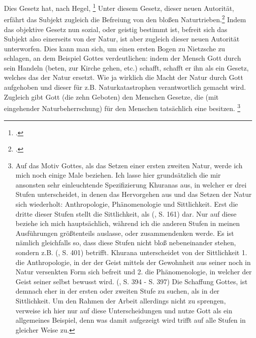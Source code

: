 \documentclass[12pt, a4paper, openany]{report}
\begin{document}
Dies Gesetz hat, nach Hegel, \footcite[][§146, S. 164.]{hegel_grundlinien_2017}
Unter diesem Gesetz, dieser neuen Autorität, erfährt das Subjekt zugleich die Befreiung von den bloßen Naturtrieben.\footcite[Vlg.][§149, S. 164]{hegel_grundlinien_2017} 
Indem das objektive Gesetz nun sozial, oder geistig bestimmt ist, befreit sich das Subjekt also einerseits von der Natur, ist aber zugleich dieser neuen Autorität unterworfen. 
Dies kann man sich, um einen ersten Bogen zu Nietzsche zu schlagen, an dem Beispiel Gottes verdeutlichen: 
indem der Mensch Gott durch sein Handeln (beten, zur Kirche gehen, etc.) schafft, schafft er ihn als ein Gesetz, welches das der Natur ersetzt. 
Wie ja wirklich die Macht der Natur durch Gott aufgehoben und dieser für z.B. Naturkatastrophen verantwortlich gemacht wird.
Zugleich gibt Gott (die zehn Geboten) den Menschen Gesetze, die (mit eingehender Naturbeherrschung) für den Menschen tatsächlich eine  besitzen.
\footnote{%
    Auf das Motiv Gottes, als das Setzen einer ersten zweiten Natur, werde ich mich noch einige Male beziehen. 
    Ich lasse hier grundsätzlich die mir ansonsten sehr einleuchtende Spezifizierung Khuranas aus, in welcher er drei Stufen unterscheidet, in denen das Hervorgehen aus und das Setzen der Natur sich wiederholt: Anthropologie, Phänomenologie und Sittlichkeit.
    Erst die dritte dieser Stufen stellt die Sittlichkeit, als  (\cite{hegel_grundlinien_2017}, S. 161) dar.
    Nur auf diese beziehe ich mich hauptsächlich, während ich die anderen Stufen in meinen Ausführungen größtenteils auslasse, oder zusammendenken werde. 
    Es ist nämlich gleichfalls so, dass diese Stufen nicht bloß nebeneinander stehen, sondern z.B.  (\cite{khurana_freiheit_2017}, S. 401) betrifft.
    Khurana unterscheidet von der Sittlichkeit 1. die Anthropologie, in der der Geist mittels der Gewohnheit aus seiner noch in Natur versenkten Form sich befreit und 2. die Phänomenologie, in welcher der Geist seiner selbst bewusst wird. 
    (\cite{khurana_freiheit_2017}, S. 394 - S. 397)
    Die Schaffung Gottes, ist demnach eher in der ersten oder zweiten Stufe zu suchen, als in der Sittlichkeit. 
    Um den Rahmen der Arbeit allerdings nicht zu sprengen, verweise ich hier nur auf diese Unterscheidungen und nutze Gott als ein allgemeines Beispiel, denn was damit aufgezeigt wird trifft auf alle Stufen in gleicher Weise zu. 
}\\
\end{document}
